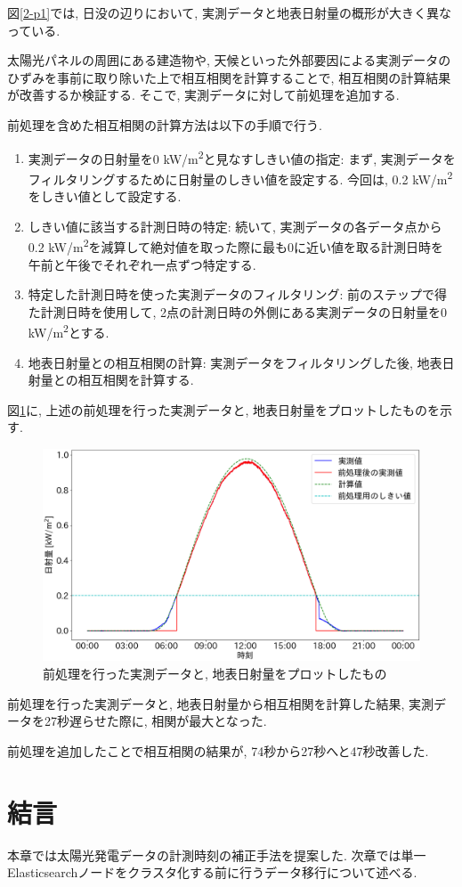 図\ref{2-p1}では, 日没の辺りにおいて, 実測データと地表日射量の概形が大きく異なっている.

太陽光パネルの周囲にある建造物や, 天候といった外部要因による実測データのひずみを事前に取り除いた上で相互相関を計算することで, 相互相関の計算結果が改善するか検証する. そこで, 実測データに対して前処理を追加する.

前処理を含めた相互相関の計算方法は以下の手順で行う.

\begin{enumerate}
  \item 実測データの日射量を0 \si{\kilo\watt}/\si{\metre\squared}と見なすしきい値の指定: まず, 実測データをフィルタリングするために日射量のしきい値を設定する. 今回は, 0.2 \si{\kilo\watt}/\si{\metre\squared}をしきい値として設定する.
  \item しきい値に該当する計測日時の特定: 続いて, 実測データの各データ点から0.2 \si{\kilo\watt}/\si{\metre\squared}を減算して絶対値を取った際に最も0に近い値を取る計測日時を午前と午後でそれぞれ一点ずつ特定する.
  \item 特定した計測日時を使った実測データのフィルタリング: 前のステップで得た計測日時を使用して, 2点の計測日時の外側にある実測データの日射量を0 \si{\kilo\watt}/\si{\metre\squared}とする.
  \item 地表日射量との相互相関の計算: 実測データをフィルタリングした後, 地表日射量との相互相関を計算する.
\end{enumerate}

図\ref{2-p2}に, 上述の前処理を行った実測データと, 地表日射量をプロットしたものを示す.

\begin{figure}[H]
  \begin{center}
    \includegraphics[width=140mm]{sotu/figure/2/drop-under-0.2-q.png}
    \caption{前処理を行った実測データと, 地表日射量をプロットしたもの}
    \label{2-p2}
  \end{center}
\end{figure}

前処理を行った実測データと, 地表日射量から相互相関を計算した結果, 実測データを27秒遅らせた際に, 相関が最大となった.

前処理を追加したことで相互相関の結果が, 74秒から27秒へと47秒改善した.

\section{結言}
本章では太陽光発電データの計測時刻の補正手法を提案した.
次章では単一Elasticsearchノードをクラスタ化する前に行うデータ移行について述べる.
